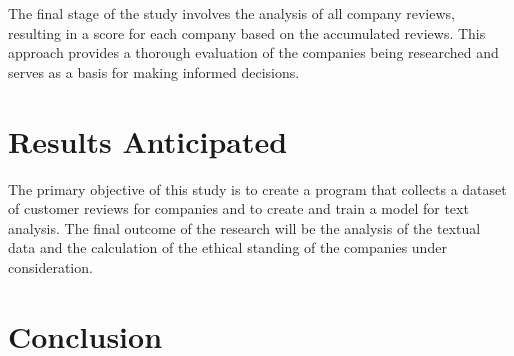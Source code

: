 \documentclass[PI]{ProjectProposal}
\begin{document}
The final stage of the study involves the analysis of all company reviews, resulting in a score for each company based on the accumulated reviews. This approach provides a thorough evaluation of the companies being researched and serves as a basis for making informed decisions.
\chapter{Results Anticipated}
\label{sec:org1ae0b71}
The primary objective of this study is to create a program that collects a dataset of customer reviews for companies and to create and train a model for text analysis. The final outcome of the research will be the analysis of the textual data and the calculation of the ethical standing of the companies under consideration.
\chapter{Conclusion}
\label{sec:orgb45679d}

\putbibliography
\appendix
\end{document}
